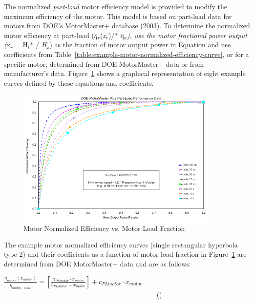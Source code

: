 The normalized \emph{part-load} motor efficiency model is provided to modify the maximum efficiency of the motor. This model is based on part-load data for motors from DOE's MotorMaster+ database (2003). To determine the normalized motor efficiency at part-load (\emph{η\(_{r}\)}(\emph{x\(_{r}\)})/* η\(_{x}\)\emph{), use the motor fractional power output (}x\(_{r}\) = H\(_{t}\)* / \emph{H\(_{x}\)}) as the fraction of motor output power in Equation and use coefficients from Table~\ref{table:example-motor-normalized-efficiency-curve}, or for a specific motor, determined from DOE MotorMaster+ data or from manufacturer's data. Figure~\ref{fig:motor-normalized-efficiency-vs.-motor-load} shows a graphical representation of eight example curves defined by these equations and coefficients.

\begin{figure}[hbtp] %
\centering
\includegraphics[width=0.9\textwidth, height=0.9\textheight, keepaspectratio=true]{media/image4919.svg.png}
\caption{Motor Normalized Efficiency vs. Motor Load Fraction \protect \label{fig:motor-normalized-efficiency-vs.-motor-load}}
\end{figure}

The example motor normalized efficiency curves (single rectangular hyperbola type 2) and their coefficients as a function of motor load fraction in Figure~\ref{fig:motor-normalized-efficiency-vs.-motor-load} are determined from DOE MotorMaster+ data and are as follows:

\(\frac{{{\eta_{motor}}({x_{motor}})}}{{{\eta_{motor,\max }}}} = \left[ {\frac{{{a_{PLmotor}} \cdot {x_{motor}}}}{{{b_{PLmotor}} + {x_{motor}}}}} \right] + {c_{PLmotor}} \cdot {x_{motor}}\) ~~~~~~~~~~~~~~~~~~~~~~~~~~~~~~~~~~~~~~~~~~~~ ()


